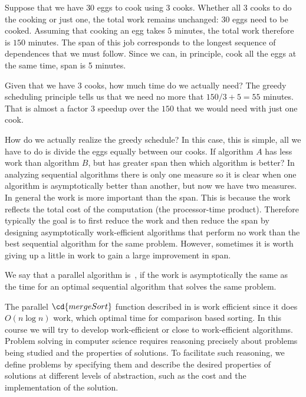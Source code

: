 Suppose that we have $30$ eggs to cook using $3$ cooks.  Whether all
$3$ cooks to do the cooking or just one, the total work remains
unchanged: $30$ eggs need to be cooked.
%
Assuming that cooking an egg takes $5$ minutes, the total work
therefore is $150$ minutes.
%
The span of this job corresponds to the longest sequence of
dependences that we must follow.
%
Since we can, in principle, cook all the eggs at the same time, 
span is 5 minutes.
%

Given that we have $3$ cooks, how much time do we actually need?
%
The greedy scheduling principle tells us that we need no more that
$150/3 + 5 = 55$ minutes. That is almost a factor $3$ speedup over the
$150$ that we would need with just one cook. 
%

How do we actually realize the greedy schedule?  In this case, this is
simple, all we have to do is divide the eggs equally between our
cooks.
If algorithm $A$ has less work than algorithm $B$, but has greater
span then which algorithm is better?  In analyzing sequential
algorithms there is only one measure so it is clear when one algorithm
is asymptotically better than another, but now we have two measures.
In general the work is more important than the span.  
%
This is because the work reflects the total cost of the computation
(the processor-time product).  Therefore typically the goal is to
first reduce the work and then reduce the span by designing
asymptotically work-efficient algorithms that perform no work
than the best sequential algorithm for the same problem. 
%
However, sometimes it is worth giving up a little in work to gain a
large improvement in span.
%

We say that a parallel algorithm is~, if the work is asymptotically the same as the time for
an optimal sequential algorithm that solves the same problem.

The parallel $\cd{mergeSort}$ function described in
 is work efficient since it does $O(n \log n)$
work, which optimal time for comparison based sorting.  In this course
we will try to develop work-efficient or close to work-efficient
algorithms.
Problem solving in computer science requires reasoning precisely about
problems being studied and the properties of solutions.
%
To facilitate such reasoning,  we define problems by
specifying them and describe the desired properties of solutions at
different levels of abstraction, such as the cost and the
implementation  of the solution.

